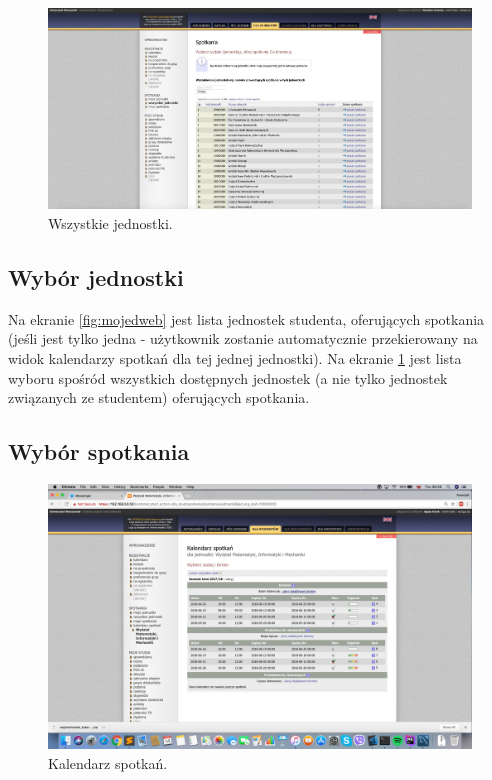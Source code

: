 \documentclass[licencjacka]{pracamgr}
\begin{document}
\begin{figure}[!]
  \includegraphics[width=\linewidth]{wszystkie_jednostki_usosweb.jpg}
  \caption{Wszystkie jednostki.}
  \label{fig:wszjweb}
\end{figure}

\subsection{Wybór jednostki}
Na ekranie \ref{fig:mojedweb} jest lista jednostek studenta, oferujących spotkania (jeśli jest tylko jedna - użytkownik zostanie automatycznie przekierowany na widok kalendarzy spotkań dla tej jednej jednostki).
Na ekranie \ref{fig:wszjweb} jest lista wyboru spośród wszystkich dostępnych jednostek (a nie tylko jednostek związanych ze studentem) oferujących spotkania.

\subsection{Wybór spotkania}

\begin{figure}[!]
  \includegraphics[width=\linewidth]{kalendarzUSOSweb.jpg}
  \caption{Kalendarz spotkań.}
  \label{fig:kalweb}
\end{figure}
\end{document}

